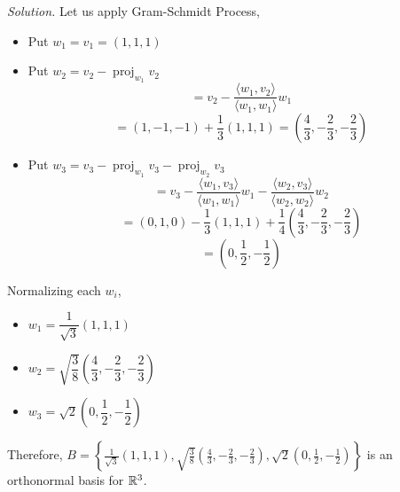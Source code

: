 \textit{Solution.} Let us apply Gram-Schmidt Process,
\begin{itemize}
    \item Put $w_1 = v_1 = (1,1, 1)$
    \item Put $w_2 = v_2 - \operatorname{proj}_{w_1}v_2$ 
    $$= v_2 - \frac{\langle w_1, v_2\rangle}{\langle w_1, w_1\rangle}w_1$$
    $$=(1, -1, -1) + \frac{1}{3}(1, 1, 1) = \left(\frac{4}{3}, -\frac{2}{3}, -\frac{2}{3}\right)$$
    \item Put $w_3 = v_3 - \operatorname{proj}_{w_1}v_3 - \operatorname{proj}_{w_2}v_3$
    $$=v_3 - \frac{\langle w_1, v_3\rangle}{\langle w_1, w_1 \rangle}w_1 - \frac{\langle w_2, v_3 \rangle}{\langle w_2, w_2 \rangle}w_2$$
    $$=(0, 1, 0) - \frac{1}{3}(1, 1, 1) + \frac{1}{4}\left(\frac{4}{3}, -\frac{2}{3}, -\frac{2}{3} \right)$$
    $$=\left(0, \frac{1}{2}, -\frac{1}{2}\right)$$
\end{itemize}

Normalizing each $w_i$,
\begin{itemize}
    \item $w_1 = \dfrac{1}{\sqrt{3}}(1, 1, 1)$
    \item $w_2 = \sqrt{\dfrac{3}{8}}\left(\dfrac{4}{3}, -\dfrac{2}{3}, -\dfrac{2}{3}\right)$
    \item $w_3 = \sqrt{2}\left(0, \dfrac{1}{2}, -\dfrac{1}{2}\right)$
\end{itemize}

Therefore, $\displaystyle B = \left\{\frac{1}{\sqrt{3}}(1, 1, 1), \sqrt{\frac{3}{8}}\left(\frac{4}{3}, -\frac{2}{3}, -\frac{2}{3}\right), \sqrt{2}\left(0, \frac{1}{2}, -\frac{1}{2}\right)\right\}$ is an orthonormal basis for $\mathbb{R}^3$.
